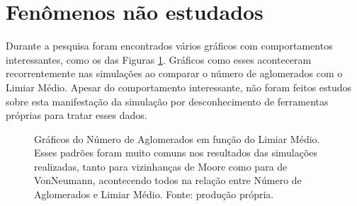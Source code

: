 \documentclass[
	12pt,				%
	openright,			%
	twoside,			%
	a4paper,			%
	english,			%
	french,				%
	spanish,			%
	brazil				%
	]{abntex2}
\begin{document}
\section{Fenômenos não estudados}

Durante a pesquisa foram encontrados vários gráficos com comportamentos interessantes, como os das Figuras \ref{fig:clusterthres}. Gráficos como esses aconteceram recorrentemente nas simulações ao comparar o número de aglomerados com o Limiar Médio. Apesar do comportamento interessante, não foram feitos estudos sobre esta manifestação da simulação por desconhecimento de ferramentas próprias para tratar esses dados.

\begin{figure}
  \centering

  \caption{Gráficos do Número de Aglomerados em função do Limiar Médio. Esses padrões foram muito comuns nos resultados das simulações realizadas, tanto para vizinhanças de Moore como para de VonNeumann, acontecendo todos na relação entre Número de Aglomerados e Limiar Médio. Fonte: produção própria.}
  \label{fig:clusterthres}
\end{figure}
\end{document}
